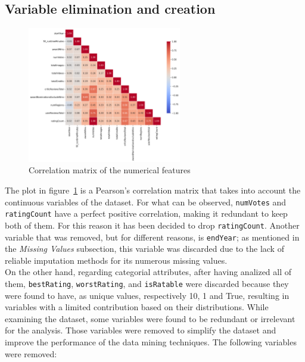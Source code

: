 \subsection{Variable elimination and creation}\label{sec:var_elim_creation}


\begin{figure}[H]
    \centering
    \includegraphics[width=0.6\textwidth]{plots/correlation_matrix.png}
    \caption{Correlation matrix of the numerical features}
    \label{fig:correlation_matrix}
\end{figure}

    The plot in figure~\ref{fig:correlation_matrix} is a Pearson's correlation matrix that takes into
    account the continuous variables of the dataset.
For what can be observed, \texttt{numVotes} and \texttt{ratingCount} have a perfect positive correlation, making it redundant to keep both of them.
For this reason it has been decided to drop \texttt{ratingCount}.
Another variable that was removed, but for different reasons, is \texttt{endYear}; as mentioned in the \textit{Missing Values} subsection, this variable was discarded due to the lack of reliable imputation methods for its numerous missing values.\\

On the other hand, regarding categorial attributes, after having analized all of them, \texttt{bestRating}, \texttt{worstRating}, and \texttt{isRatable} were discarded because 
they were found to have, as unique values, respectively 10, 1 and True, resulting in variables with a limited contribution based on their distributions.
While examining the dataset, some variables were found to be redundant or irrelevant for the analysis.
Those variables were removed to simplify the dataset and improve the performance of the data mining
techniques.
The following variables were removed:

